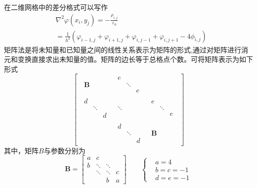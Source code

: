 \documentclass[twoside,twocolumn]{article}
\begin{document}
\begin{CJK*}{UTF8}{gkai}
	在二维网格中的差分格式可以写作
	\begin{equation*}
	\begin{aligned}
	&\nabla^{2}\varphi(x_{i},y_{j})=-\frac{\rho_{i,j}}{\varepsilon_{0}}\\
	&=\frac{1}{h^{2}}(\varphi_{i-1,j}+\varphi_{i+1,j}+\varphi_{i,j-1}+\varphi_{i,j+1}-4\phi_{i,j})
	\end{aligned}
	\end{equation*}
	矩阵法是将未知量和已知量之间的线性关系表示为矩阵的形式,通过对矩阵进行消元和变换直接求出未知量的值。矩阵的边长等于总格点个数。可将矩阵表示为如下形式
	\begin{equation*}
	\left[~
	\begin{array}{c|c|c}
		\begin{matrix}
		\mathbf{B}
		\end{matrix}&
		\begin{matrix}
		e& &\\
		&\ddots&\\
		& &e
		\end{matrix}&
		\begin{matrix}
		\end{matrix}
		\\\hline
		\begin{matrix}
		d& &\\
		&\ddots&\\
		& &d
		\end{matrix}&
		\begin{matrix}
		\mathbf{\ddots}
		\end{matrix}&
		\begin{matrix}
		e& &\\
		&\ddots&\\
		& &e
		\end{matrix}
		\\\hline
		\begin{matrix}
		\end{matrix}&
		\begin{matrix}
		d& &\\
		&\ddots&\\
		& &d
		\end{matrix}&
		\begin{matrix}
		\mathbf{B}
		\end{matrix}
	\end{array}
	~\right]
	\end{equation*}
	其中，矩阵$B$与参数分别为
	\begin{equation*}
	\mathbf{B}=
	\begin{bmatrix}
	a&c&&\\
	b&\ddots&\ddots&\\
	&\ddots&\ddots&c\\
	&&b&a
	\end{bmatrix}
	\qquad \left\{
	\begin{aligned}
	&a=4\\
	&b=c=-1\\
	&d=e=-1
	\end{aligned}
	\right.
	\end{equation*}

\end{CJK*}
\end{document}
